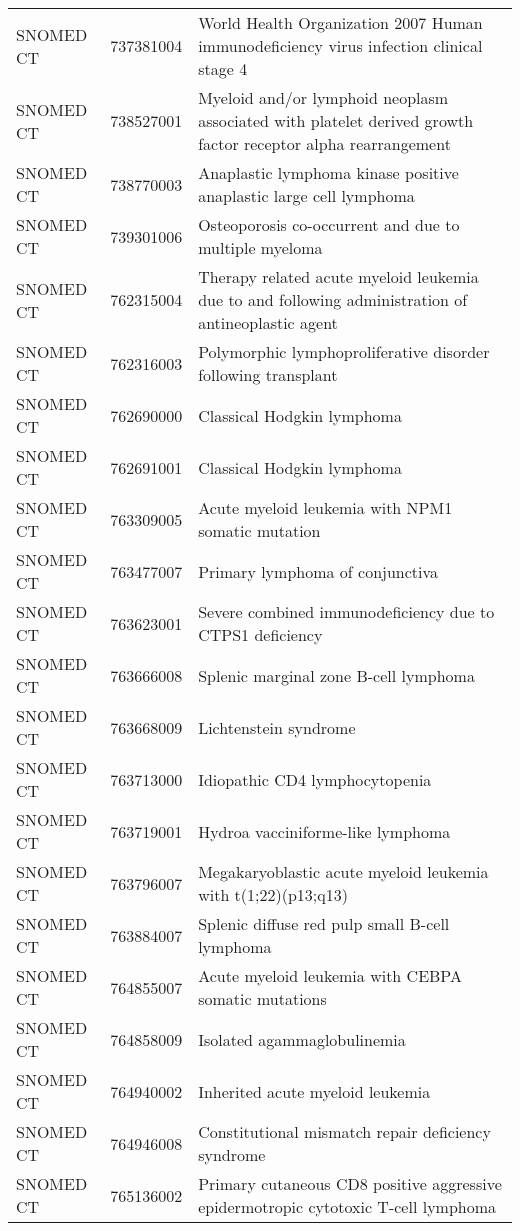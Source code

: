 \begin{table}[ht]
\begin{tabular}{lll}
  SNOMED CT & 737381004 & World Health Organization 2007 Human immunodeficiency virus infection clinical stage 4 \\ 
  SNOMED CT & 738527001 & Myeloid and/or lymphoid neoplasm associated with platelet derived growth factor receptor alpha rearrangement \\ 
  SNOMED CT & 738770003 & Anaplastic lymphoma kinase positive anaplastic large cell lymphoma \\ 
  SNOMED CT & 739301006 & Osteoporosis co-occurrent and due to multiple myeloma \\ 
  SNOMED CT & 762315004 & Therapy related acute myeloid leukemia due to and following administration of antineoplastic agent \\ 
  SNOMED CT & 762316003 & Polymorphic lymphoproliferative disorder following transplant \\ 
  SNOMED CT & 762690000 & Classical Hodgkin lymphoma \\ 
  SNOMED CT & 762691001 & Classical Hodgkin lymphoma \\ 
  SNOMED CT & 763309005 & Acute myeloid leukemia with NPM1 somatic mutation \\ 
  SNOMED CT & 763477007 & Primary lymphoma of conjunctiva \\ 
  SNOMED CT & 763623001 & Severe combined immunodeficiency due to CTPS1 deficiency \\ 
  SNOMED CT & 763666008 & Splenic marginal zone B-cell lymphoma \\ 
  SNOMED CT & 763668009 & Lichtenstein syndrome \\ 
  SNOMED CT & 763713000 & Idiopathic CD4 lymphocytopenia \\ 
  SNOMED CT & 763719001 & Hydroa vacciniforme-like lymphoma \\ 
  SNOMED CT & 763796007 & Megakaryoblastic acute myeloid leukemia with t(1;22)(p13;q13) \\ 
  SNOMED CT & 763884007 & Splenic diffuse red pulp small B-cell lymphoma \\ 
  SNOMED CT & 764855007 & Acute myeloid leukemia with CEBPA somatic mutations \\ 
  SNOMED CT & 764858009 & Isolated agammaglobulinemia \\ 
  SNOMED CT & 764940002 & Inherited acute myeloid leukemia \\ 
  SNOMED CT & 764946008 & Constitutional mismatch repair deficiency syndrome \\ 
  SNOMED CT & 765136002 & Primary cutaneous CD8 positive aggressive epidermotropic cytotoxic T-cell lymphoma \\ 

\end{tabular}
\end{table}
